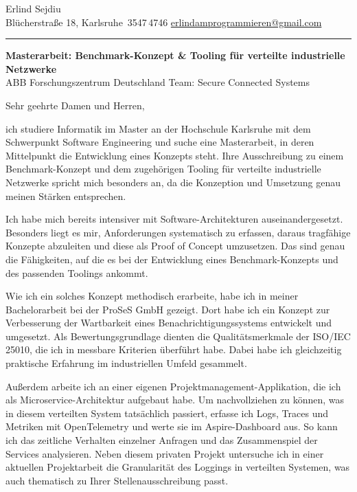 \documentclass[a4paper,11pt]{article}
\begin{document}
{\LARGE Erlind Sejdiu}\\[0.3em]
{\small\color{muted}
Blücherstraße 18, Karlsruhe \enspace\textbar{}\,3547\,4746 \enspace\textbar\enspace
\href{mailto:erlindamprogrammieren@gmail.com}{erlindamprogrammieren@gmail.com}}\\[0.4em]
\textcolor{hairline}{\rule{\linewidth}{0.7pt}}

\vspace{0.9em}

{\large\textbf{Masterarbeit: Benchmark-Konzept \& Tooling für verteilte industrielle Netzwerke}}\\[0.15em]
{\small\color{muted}ABB Forschungszentrum Deutschland \enspace\textbar\enspace Team: Secure Connected Systems}

\vspace{0.4em}

Sehr geehrte Damen und Herren,

ich studiere Informatik im Master an der Hochschule Karlsruhe mit dem Schwerpunkt Software Engineering und suche eine Masterarbeit, in deren Mittelpunkt die Entwicklung eines Konzepts steht. Ihre Ausschreibung zu einem Benchmark-Konzept und dem zugehörigen Tooling für verteilte industrielle Netzwerke spricht mich besonders an, da die Konzeption und Umsetzung genau meinen Stärken entsprechen.

Ich habe mich bereits intensiver mit Software-Architekturen auseinandergesetzt. Besonders liegt es mir, Anforderungen systematisch zu erfassen, daraus tragfähige Konzepte abzuleiten und diese als Proof of Concept umzusetzen. Das sind genau die Fähigkeiten, auf die es bei der Entwicklung eines Benchmark-Konzepts und des passenden Toolings ankommt.

Wie ich ein solches Konzept methodisch erarbeite, habe ich in meiner Bachelorarbeit bei der ProSeS GmbH gezeigt. Dort habe ich ein Konzept zur Verbesserung der Wartbarkeit eines Benachrichtigungssystems entwickelt und umgesetzt. Als Bewertungsgrundlage dienten die Qualitätsmerkmale der ISO/IEC 25010, die ich in messbare Kriterien überführt habe. Dabei habe ich gleichzeitig praktische Erfahrung im industriellen Umfeld gesammelt.

Außerdem arbeite ich an einer eigenen Projektmanagement-Applikation, die ich als Microservice-Architektur aufgebaut habe. Um nachvollziehen zu können, was in diesem verteilten System tatsächlich passiert, erfasse ich Logs, Traces und Metriken mit OpenTelemetry und werte sie im Aspire-Dashboard aus. So kann ich das zeitliche Verhalten einzelner Anfragen und das Zusammenspiel der Services analysieren. Neben diesem privaten Projekt untersuche ich in einer aktuellen Projektarbeit die Granularität des Loggings in verteilten Systemen, was auch thematisch zu Ihrer Stellenausschreibung passt.
\end{document}
